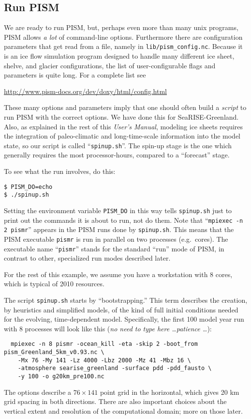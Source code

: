 \subsection{Run PISM}

We are ready to run PISM, but, perhaps even more than many unix programs, PISM allows \emph{a lot} of command-line options.  Furthermore there are configuration parameters that get read from a file, namely in \texttt{lib/pism_config.nc}.  Because it is an ice flow simulation program designed to handle many different ice sheet, shelve, and glacier configurations, the list of user-configurable flags and parameters is quite long.  For a complete list see
\begin{center}
\url{http://www.pism-docs.org/dev/doxy/html/config.html}
\end{center}

These many options and parameters imply that one should often build a \emph{script} to run PISM with the correct options.  We have done this for SeaRISE-Greenland.  Also, as explained in the rest of this \emph{User's Manual}, modeling ice sheets requires the integration of paleo-climatic and long-time-scale information into the model state, so our script is called ``\texttt{spinup.sh}''.  The spin-up stage is the one which generally requires the most processor-hours, compared to a ``forecast'' stage.

To see what the run involves, do this:
\begin{verbatim}
$ PISM_DO=echo
$ ./spinup.sh
\end{verbatim}
\noindent Setting the environment variable \texttt{PISM_DO} in this way tells \texttt{spinup.sh} just to print out the commands it is about to run, not do them.  Note that ``\texttt{mpiexec -n 2 pismr}'' appears in the PISM runs done by \texttt{spinup.sh}.  This means that the PISM executable \texttt{pismr} is run in parallel on two processes (e.g.~cores).  The executable name ``\texttt{pismr}'' stands for the standard ``run'' mode of PISM, in contrast to other, specialized run modes described later.

For the rest of this example, we assume you have a workstation with 8 cores, which is typical of 2010 resources.

The script \texttt{spinup.sh} starts by ``bootstrapping.''  This term describes the creation, by heuristics and simplified models, of the kind of full initial conditions needed for the evolving, time-dependent model.  Specifically, the first 100 model year run with 8 processes will look like this (\emph{no need to type here \dots patience \dots}):
\small
\begin{verbatim}
  mpiexec -n 8 pismr -ocean_kill -eta -skip 2 -boot_from pism_Greenland_5km_v0.93.nc \
    -Mx 76 -My 141 -Lz 4000 -Lbz 2000 -Mz 41 -Mbz 16 \
    -atmosphere searise_greenland -surface pdd -pdd_fausto \
    -y 100 -o g20km_pre100.nc
\end{verbatim}
\normalsize
The options describe a $76\times 141$ point grid in the horizontal, which gives 20 km grid spacing in both directions.  There are also important choices about the vertical extent and resolution of the computational domain; more on those later.  

